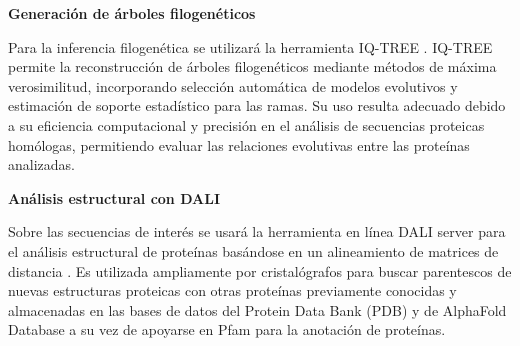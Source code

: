 \hspace{1cm}\textbf{Generación de árboles filogenéticos}

Para la inferencia filogenética se utilizará la herramienta IQ-TREE \parencite{Minh_2020, Wong_2025}. IQ-TREE permite la reconstrucción de árboles filogenéticos mediante métodos de máxima verosimilitud, incorporando selección automática de modelos evolutivos y estimación de soporte estadístico para las ramas. Su uso resulta adecuado debido a su eficiencia computacional y precisión en el análisis de secuencias proteicas homólogas, permitiendo evaluar las relaciones evolutivas entre las proteínas analizadas.

\hspace{1cm}\textbf{Análisis estructural con DALI}

Sobre las secuencias de interés se usará la herramienta en línea DALI server \parencite{Holm_2023} para el análisis estructural de proteínas basándose en un alineamiento de matrices de distancia \parencite{Holm_2019}. Es utilizada ampliamente por cristalógrafos para buscar parentescos de nuevas estructuras proteicas con otras proteínas previamente conocidas y almacenadas en las bases de datos del Protein Data Bank (PDB) y de AlphaFold Database \parencite{Holm_2022} a su vez de apoyarse en Pfam \parencite{Mistry_2020} para la anotación de proteínas.   